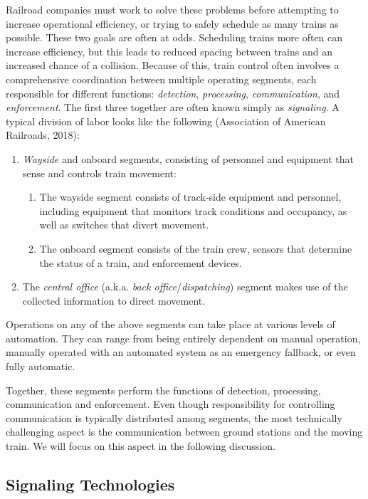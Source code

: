 \documentclass[11pt, titlepage]{article}
\begin{document}
Railroad companies must work to solve these problems before attempting to increase
operational efficiency, or trying to safely schedule as many trains as possible.
These two goals are often at odds. Scheduling trains more often can increase
efficiency, but this leads to reduced spacing between trains and an increased
chance of a collision. Because of this, train control often involves a
comprehensive coordination between multiple operating segments, each responsible
for different functions: \textit{detection}, \textit{processing},
\textit{communication}, and \textit{enforcement}. The first three together are
often known simply as \textit{signaling}. A typical division of labor looks like
the following (Association of American Railroads, 2018):

\begin{enumerate}
    \item \textit{Wayside} and {onboard} segments, consisting of personnel and
    equipment that sense and controls train movement:
    \begin{enumerate}
        \item The wayside segment consists of track-side equipment and personnel,
        including equipment that monitors track conditions and occupancy, as well
        as switches that divert movement.
        \item The onboard segment consists of the train crew, sensors that
        determine the status of a train, and enforcement devices.
    \end{enumerate}
    \item The \textit{central office} (a.k.a. \textit{back
    office}/\textit{dispatching}) segment makes use of the collected information
    to direct movement.
\end{enumerate}
Operations on any of the above segments can take place at various levels of
automation. They can range from being entirely dependent on manual operation,
manually operated with an automated system as an emergency fallback, or even fully
automatic.

Together, these segments perform the functions of detection, processing,
communication and enforcement. Even though responsibility for controlling
communication is typically distributed among segments, the most technically
challenging aspect is the communication between ground stations and the moving
train. We will focus on this aspect in the following discussion.

\subsection{Signaling Technologies}
\end{document}
